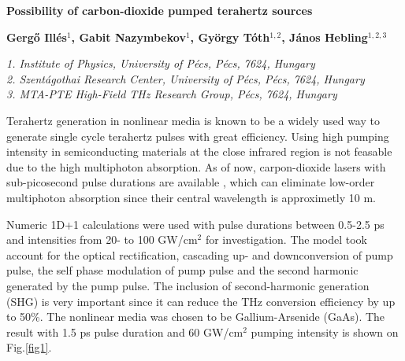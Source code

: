 \documentclass{article}
\begin{document}
\begin{center}
{\Large\bfseries
Possibility of carbon\hyp{}dioxide pumped terahertz sources\par}
\vspace{3ex}
{\bfseries
Gergő Illés$^{1}$, Gabit Nazymbekov$^{1}$, György Tóth$^{1,2}$, János Hebling$^{1,2,3}$\par}
{\footnotesize\itshape
1. Institute of Physics, University of Pécs, Pécs, 7624, Hungary\\
2. Szentágothai Research Center, University of Pécs, Pécs, 7624, Hungary\\
3. MTA-PTE High-Field THz Research Group, Pécs, 7624, Hungary\par}
\vspace{3ex}
\end{center}
Terahertz generation in nonlinear media is known to be a widely used way to generate single cycle terahertz pulses with great efficiency. Using high pumping intensity in semiconducting materials at the close infrared region is not feasable due to the high multiphoton absorption. \cite{polonyi2016high} As of now, carpon\hyp{}dioxide lasers with sub-picosecond pulse durations are available \cite{polyanskiy2020demonstration}, which can eliminate low-order multiphoton absorption since their central wavelength is approximetly 10 \textmu m.

Numeric 1D+1 calculations were used with pulse durations between 0.5\hyp{}2.5 ps and intensities from 20\hyp{} to 100 GW/cm$^2$ for investigation. The model took account for the optical rectification, cascading up\hyp{} and downconversion of pump pulse, the self phase modulation of pump pulse \cite{ravi2014limitations} and the second harmonic generated by the pump pulse. The inclusion of second-harmonic generation (SHG) is very important since it can reduce the THz conversion efficiency by up to 50\%. The nonlinear media was chosen to be Gallium-Arsenide (GaAs). The result with 1.5 ps pulse duration and 60 GW/cm$^2$ pumping intensity is shown on {Fig.\ref{fig1}}.

\end{document}
